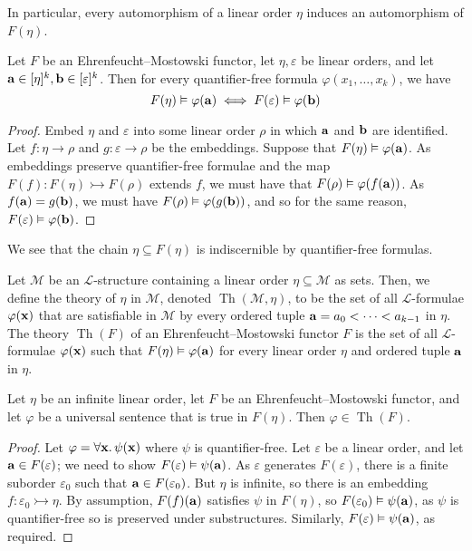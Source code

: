 In particular, every automorphism of a linear order \( \eta \) induces an automorphism of \( F(\eta) \).
\begin{proposition}
	Let \( F \) be an Ehrenfeucht--Mostowski functor, let \( \eta, \varepsilon \) be linear orders, and let \( \vb a \in [\eta]^k, \vb b \in [\varepsilon]^k \).
	Then for every quantifier-free formula \( \varphi(x_1, \dots, x_k) \), we have
	\[ F(\eta) \vDash \varphi(\vb a) \iff F(\varepsilon) \vDash \varphi(\vb b) \]
\end{proposition}
\begin{proof}
	Embed \( \eta \) and \( \varepsilon \) into some linear order \( \rho \) in which \( \vb a \) and \( \vb b \) are identified.
	Let \( f : \eta \to \rho \) and \( g : \varepsilon \to \rho \) be the embeddings.
	Suppose that \( F(\eta) \vDash \varphi(\vb a) \).
	As embeddings preserve quantifier-free formulae and the map \( F(f) : F(\eta) \rightarrowtail F(\rho) \) extends \( f \), we must have that \( F(\rho) \vDash \varphi(f(\vb a)) \).
	As \( f(\vb a) = g(\vb b) \), we must have \( F(\rho) \vDash \varphi(g(\vb b)) \), and so for the same reason, \( F(\varepsilon) \vDash \varphi(\vb b) \).
\end{proof}
We see that the chain \( \eta \subseteq F(\eta) \) is indiscernible by quantifier-free formulas.
\begin{definition}
	Let \( \mathcal M \) be an \( \mathcal L \)-structure containing a linear order \( \eta \subseteq \mathcal M \) as sets.
	Then, we define the theory of \( \eta \) in \( \mathcal M \), denoted \( \operatorname{Th}(\mathcal M, \eta) \), to be the set of all \( \mathcal L \)-formulae \( \varphi(\vb x) \) that are satisfiable in \( \mathcal M \) by every ordered tuple \( \vb a = a_0 < \dots < a_{k-1} \) in \( \eta \).
	The theory \( \operatorname{Th}(F) \) of an Ehrenfeucht--Mostowski functor \( F \) is the set of all \( \mathcal L \)-formulae \( \varphi(\vb x) \) such that \( F(\eta) \vDash \varphi(\vb a) \) for every linear order \( \eta \) and ordered tuple \( \vb a \) in \( \eta \).
\end{definition}
\begin{lemma}
	Let \( \eta \) be an infinite linear order, let \( F \) be an Ehrenfeucht--Mostowski functor, and let \( \varphi \) be a universal sentence that is true in \( F(\eta) \).
	Then \( \varphi \in \operatorname{Th}(F) \).
\end{lemma}
\begin{proof}
	Let \( \varphi = \forall \vb x.\, \psi(\vb x) \) where \( \psi \) is quantifier-free.
	Let \( \varepsilon \) be a linear order, and let \( \vb a \in F(\varepsilon) \); we need to show \( F(\varepsilon) \vDash \psi(\vb a) \).
	As \( \varepsilon \) generates \( F(\varepsilon) \), there is a finite suborder \( \varepsilon_0 \) such that \( \vb a \in F(\varepsilon_0) \).
	But \( \eta \) is infinite, so there is an embedding \( f : \varepsilon_0 \rightarrowtail \eta \).
	By assumption, \( F(f)(\vb a) \) satisfies \( \psi \) in \( F(\eta) \), so \( F(\varepsilon_0) \vDash \psi(\vb a) \), as \( \psi \) is quantifier-free so is preserved under substructures.
	Similarly, \( F(\varepsilon) \vDash \psi(\vb a) \), as required.
\end{proof}

